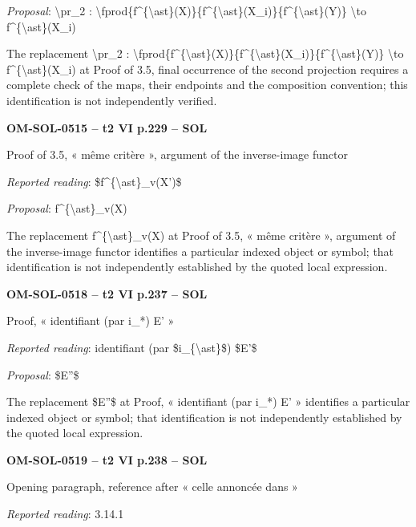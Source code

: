 \emph{Proposal}: \textbackslash{}pr\_2 : \textbackslash{}fprod\{f\textasciicircum{}\{\textbackslash{}ast\}(X)\}\{f\textasciicircum{}\{\textbackslash{}ast\}(X\_i)\}\{f\textasciicircum{}\{\textbackslash{}ast\}(Y)\} \textbackslash{}to f\textasciicircum{}\{\textbackslash{}ast\}(X\_i)\par
The replacement \textbackslash{}pr\_2 : \textbackslash{}fprod\{f\textasciicircum{}\{\textbackslash{}ast\}(X)\}\{f\textasciicircum{}\{\textbackslash{}ast\}(X\_i)\}\{f\textasciicircum{}\{\textbackslash{}ast\}(Y)\} \textbackslash{}to f\textasciicircum{}\{\textbackslash{}ast\}(X\_i) at Proof of 3.5, final occurrence of the second projection requires a complete check of the maps, their endpoints and the composition convention; this identification is not independently verified.\par
\par\noindent\textbf{OM-SOL-0515 -- t2 VI p.229 -- SOL}\par
Proof of 3.5, « même critère », argument of the inverse-image functor\par
\emph{Reported reading}: \$f\textasciicircum{}\{\textbackslash{}ast\}\_v(X')\$\par
\emph{Proposal}: f\textasciicircum{}\{\textbackslash{}ast\}\_v(X)\par
The replacement f\textasciicircum{}\{\textbackslash{}ast\}\_v(X) at Proof of 3.5, « même critère », argument of the inverse-image functor identifies a particular indexed object or symbol; that identification is not independently established by the quoted local expression.\par
\par\noindent\textbf{OM-SOL-0518 -- t2 VI p.237 -- SOL}\par
Proof, « identifiant (par i\_*) E' »\par
\emph{Reported reading}: identifiant (par \$i\_\{\textbackslash{}ast\}\$) \$E'\$\par
\emph{Proposal}: \$E''\$\par
The replacement \$E''\$ at Proof, « identifiant (par i\_*) E' » identifies a particular indexed object or symbol; that identification is not independently established by the quoted local expression.\par
\par\noindent\textbf{OM-SOL-0519 -- t2 VI p.238 -- SOL}\par
Opening paragraph, reference after « celle annoncée dans »\par
\emph{Reported reading}: 3.14.1\par
